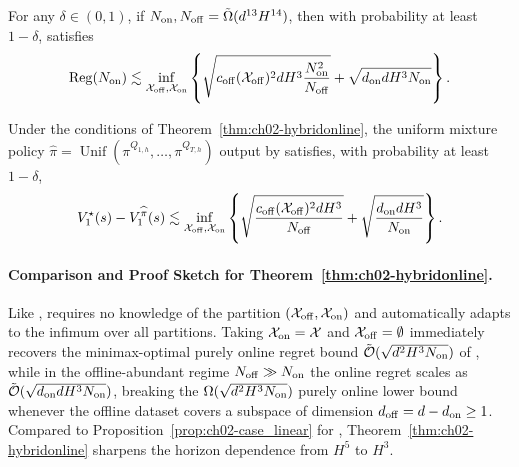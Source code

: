 \begin{thm}
\label{thm:ch02-hybridonline}
For any $\delta \in (0,1)$, if $N_{{\operatorname{on}}}, N_{{\operatorname{off}}} = \tilde{\Omega}(d^{13}H^{14})$, then with probability at least $1-\delta$,  satisfies
\begin{equation}
    \operatorname{Reg}(N_{{\operatorname{on}}}) \lesssim \inf_{{\mathcal{X}}_{{\operatorname{off}}}, {\mathcal{X}}_{{\operatorname{on}}}}\left\{\sqrt{c_{{\operatorname{off}}}({\mathcal{X}}_{{\operatorname{off}}})^{2}dH^3\frac{N_{{\operatorname{on}}}^2}{N_{{\operatorname{off}}}}} + \sqrt{d_{{\operatorname{on}}}d H^3N_{{\operatorname{on}}}}\right\}.
\end{equation}
\end{thm}

\begin{cor}
\label{cor:ch02-hyrule-pac}
Under the conditions of Theorem~\ref{thm:ch02-hybridonline}, the uniform mixture policy $\widehat{\pi} = \operatorname{Unif}(\pi^{Q_{1,h}},\dots,\pi^{Q_{T,h}})$ output by  satisfies, with probability at least $1-\delta$,
\begin{equation}
    V_1^\star(s)-V_1^{\widehat{\pi}}(s)\lesssim \inf_{{\mathcal{X}}_{{\operatorname{off}}}, {\mathcal{X}}_{{\operatorname{on}}}}\left\{\sqrt{\frac{c_{{\operatorname{off}}}({\mathcal{X}}_{{\operatorname{off}}})^2dH^3}{N_{{\operatorname{off}}}}} + \sqrt{\frac{d_{{\operatorname{on}}}d H^3}{N_{{\operatorname{on}}}}}\right\}.
\end{equation}
\end{cor}

\paragraph{Comparison and Proof Sketch for Theorem~\ref{thm:ch02-hybridonline}.}
Like ,  requires no knowledge of the partition $({\mathcal{X}}_{{\operatorname{off}}}, {\mathcal{X}}_{{\operatorname{on}}})$ and automatically adapts to the infimum over all partitions. Taking ${\mathcal{X}}_{{\operatorname{on}}} = {\mathcal{X}}$ and ${\mathcal{X}}_{{\operatorname{off}}} = \emptyset$ immediately recovers the minimax-optimal purely online regret bound $\tilde{{\mathcal{O}}}(\sqrt{d^2 H^3 N_{{\operatorname{on}}}})$ of \citet{he2023nearly}, while in the offline-abundant regime $N_{{\operatorname{off}}} \gg N_{{\operatorname{on}}}$ the online regret scales as $\tilde{{\mathcal{O}}}(\sqrt{d_{{\operatorname{on}}} d H^3 N_{{\operatorname{on}}}})$, breaking the $\Omega(\sqrt{d^2 H^3 N_{{\operatorname{on}}}})$ purely online lower bound whenever the offline dataset covers a subspace of dimension $d_{{\operatorname{off}}} = d - d_{{\operatorname{on}}} \geq 1$. Compared to Proposition~\ref{prop:ch02-case_linear} for , Theorem~\ref{thm:ch02-hybridonline} sharpens the horizon dependence from $H^5$ to $H^3$.

